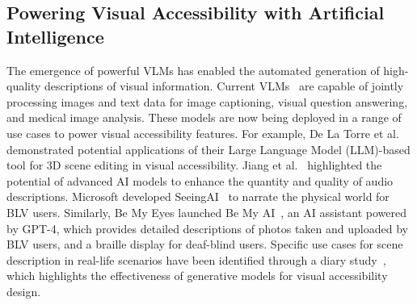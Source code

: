 \subsection{Powering Visual Accessibility with Artificial Intelligence}

The emergence of powerful VLMs has enabled the automated generation of high-quality descriptions of visual information.  %
Current VLMs~\cite{salin2022vision,pmlr-v139-cho21a,luo2022vc,bongini2023gpt,zhang2023gpt4mia} are capable of jointly processing images and text data for image captioning, visual question answering, and medical image analysis. %
These models are now being deployed in a range of use cases to power visual accessibility features. 
For example, De La Torre et al.~\cite{de2024llmr} demonstrated potential applications of their Large Language Model (LLM)-based tool for 3D scene editing in visual accessibility. Jiang et al.~\cite{jiang2023beyond} highlighted the potential of advanced AI models to enhance the quantity and quality of audio descriptions.
Microsoft developed SeeingAI~\cite{microsoft-seeing-ai} to narrate the physical world for BLV users.
Similarly, Be My Eyes launched Be My AI~\cite{BeMyAI}, an AI assistant powered by GPT-4, which provides detailed descriptions of photos taken and uploaded by BLV users, and a braille display for deaf-blind users. %
Specific use cases for scene description in real-life scenarios have been identified through a diary study~\cite{gonzalez2024investigating}, which highlights the effectiveness of generative models for visual accessibility design.

